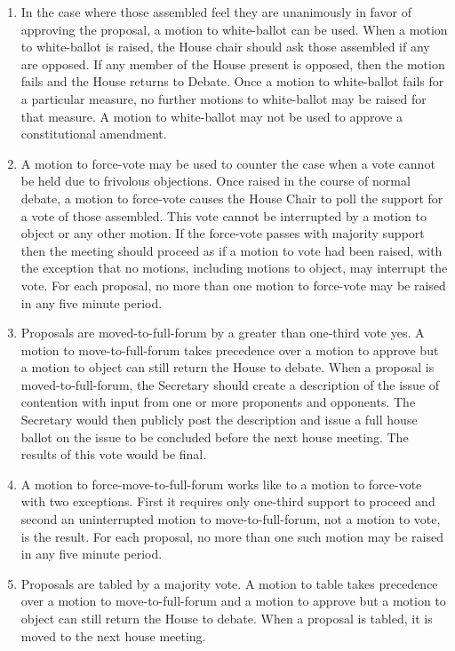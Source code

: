\documentclass[letterpaper]{article}
\begin{document}
\begin{enumerate}
\begin{enumerate}
\begin{enumerate}
\item In the case where those assembled feel they are unanimously in favor of approving the proposal, a motion to white-ballot can be used. When a motion to white-ballot is raised, the House chair should ask those assembled if any are opposed. If any member of the House present is opposed, then the motion fails and the House returns to Debate. Once a motion to white-ballot fails for a particular measure, no further motions to white-ballot may be raised for that measure. A motion to white-ballot may not be used to approve a constitutional amendment.

\item A motion to force-vote may be used to counter the case when a vote cannot be held due to frivolous objections. Once raised in the course of normal debate, a motion to force-vote causes the House Chair to poll the support for a vote of those assembled. This vote cannot be interrupted by a motion to object or any other motion. If the force-vote passes with majority support then the meeting should proceed as if a motion to vote had been raised, with the exception that no motions, including motions to object, may interrupt the vote. For each proposal, no more than one motion to force-vote may be raised in any five minute period.

\item Proposals are moved-to-full-forum by a greater than one-third vote yes. A motion to move-to-full-forum takes precedence over a motion to approve but a motion to object can still return the House to debate. When a proposal is moved-to-full-forum, the Secretary should create a description of the issue of contention with input from one or more proponents and opponents. The Secretary would then publicly post the description and issue a full house ballot on the issue to be concluded before the next house meeting. The results of this vote would be final.

\item A motion to force-move-to-full-forum works like to a motion to force-vote with two exceptions. First it requires only one-third support to proceed and second an uninterrupted motion to move-to-full-forum, not a motion to vote, is the result. For each proposal, no more than one such motion may be raised in any five minute period.

\item Proposals are tabled by a majority vote. A motion to table takes precedence over a motion to move-to-full-forum and a motion to approve but a motion to object can still return the House to debate. When a proposal is tabled, it is moved to the next house meeting.


\end{enumerate}
\end{enumerate}
\end{enumerate}
\end{document}
